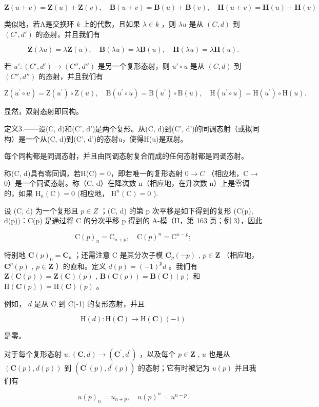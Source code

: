 \[
\mathbf {Z} (u + v) = \mathbf {Z} (u) + \mathbf {Z} (v), \quad \mathbf {B} (u + v) = \mathbf {B} (u) + \mathbf {B} (v), \quad \mathbf {H} (u + v) = \mathbf {H} (u) + \mathbf {H} (v)
\]

类似地，若A是交换环 \(k\) 上的代数，且如果 \(\lambda \in k\) ，则 \(\lambda u\) 是从 \((C, d)\) 到 \((C', d')\) 的态射，并且我们有

\[
\mathbf {Z} (\lambda u) = \lambda \mathbf {Z} (u), \quad \mathbf {B} (\lambda u) = \lambda \mathbf {B} (u), \quad \mathbf {H} (\lambda u) = \lambda \mathbf {H} (u).
\]

若 \(u': (C', d') \to (C'', d'')\) 是另一个复形态射，则 \(u' \circ u\) 是从 \((C, d)\) 到 \((C'', d'')\) 的态射，并且我们有

\[
\mathrm{Z} \left(u ^ {\prime} \circ u\right) = \mathrm{Z} \left(u ^ {\prime}\right) \circ \mathrm{Z} (u), \quad \mathrm{B} \left(u ^ {\prime} \circ u\right) = \mathrm{B} \left(u ^ {\prime}\right) \circ \mathrm{B} (u), \quad \mathrm{H} \left(u ^ {\prime} \circ u\right) = \mathrm{H} \left(u ^ {\prime}\right) \circ \mathrm{H} (u).
\]

显然，双射态射即同构。

定义3.——设(C, d)和(C', d')是两个复形。从(C, d)到(C', d')的同调态射（或拟同构）是一个从(C, d)到(C', d')的态射u，使得H(u)是双射。

每个同构都是同调态射，并且由同调态射复合而成的任何态射都是同调态射。

称(C, d)具有零同调，若H(C) = 0，即若唯一的复形态射 \(0 \rightarrow C\) （相应地，C → 0）是一个同调态射。称（C, d）在降次数 n（相应地，在升次数 n）上是零调的，如果 \(\mathrm{H}_{n}(\mathrm{C}) = 0\) (相应地， \(\mathrm{H}^{n}(\mathrm{C}) = 0\) ).

设 (C, d) 为一个复形且 \(p \in Z\) ；(C, d) 的第 p 次平移是如下得到的复形 (C(p), d(p))：C(p) 是通过将 C 的分次平移 p 得到的 A-模（II，第 163 页；例 3），因此

\[
\mathrm{C} (p) _ {n} = \mathrm{C} _ {n + p}, \quad \mathrm{C} (p) ^ {n} = \mathrm{C} ^ {n - p};
\]

特别地 \(\mathbf{C}(p)_{0} = \mathbf{C}_{p}\) ；还需注意 C 是其分次子模 \(\mathbf{C}_{p}(-p)\) , \(p \in \mathbf{Z}\) （相应地， \(\mathbf{C}^{p}(p)\) , \(p \in \mathbf{Z}\) ）的直和。定义 \(d(p) = (-1)^{p} d\) 。我们有 \(\mathbf{Z}(\mathbf{C}(p)) = \mathbf{Z}(\mathbf{C})(p)\) , \(\mathbf{B}(\mathbf{C}(p)) = \mathbf{B}(\mathbf{C})(p)\) 和 \(\mathrm{H}(\mathbf{C}(p)) = \mathrm{H}(\mathbf{C})(p)\) 。

例如， \(d\) 是从 C 到 C(-1) 的复形态射，并且

\[
\mathrm{H} (d): \mathrm{H} (\mathbf {C}) \to \mathrm{H} (\mathbf {C}) (- 1)
\]

是零。

对于每个复形态射 \(u:(\mathbf{C},d)\to(\mathbf{C}^{\prime},d^{\prime})\) ，以及每个 \(p\in\mathbf{Z}\) , \(u\) 也是从 \((\mathbf{C}(p),d(p))\) 到 \((\mathbf{C}^{\prime}(p),d^{\prime}(p))\) 的态射；它有时被记为 \(u(p)\) 并且我们有

\[
u (p) _ {n} = u _ {n + p}, \quad u (p) ^ {n} = u ^ {n - p}.
\]
\relax{}
